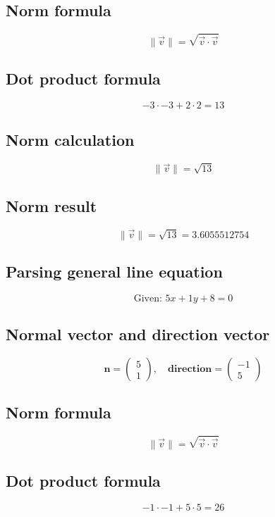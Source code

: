 \documentclass{article}
\begin{document}
\subsection*{ \vspace{1em} Norm formula}
\[
\|\vec{v}\| = \sqrt{\vec{v} \cdot \vec{v}}
\]
\subsection*{ \vspace{1em} Dot product formula}
\[
-3 \cdot -3 + 2 \cdot 2 = 13
\]
\subsection*{ \vspace{1em} Norm calculation}
\[
\|\vec{v}\| = \sqrt{13}
\]
\subsection*{ \vspace{1em} Norm result}
\[
\|\vec{v}\| = \sqrt{13} = 3.6055512754
\]
\subsection*{ \vspace{1em} Parsing general line equation}
\[
\text{Given: } 5x + 1y + 8 = 0
\]
\subsection*{ \vspace{1em} Normal vector and direction vector}
\[
\mathbf{n} = \begin{pmatrix}5 \\ 1\end{pmatrix}, \quad
           \mathbf{direction} = \begin{pmatrix}-1 \\ 5\end{pmatrix}
\]
\subsection*{ \vspace{1em} Norm formula}
\[
\|\vec{v}\| = \sqrt{\vec{v} \cdot \vec{v}}
\]
\subsection*{ \vspace{1em} Dot product formula}
\[
-1 \cdot -1 + 5 \cdot 5 = 26
\]
\end{document}
